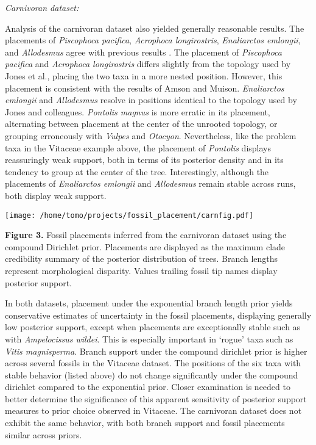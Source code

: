 \documentclass[12pt]{article}
\begin{document}
\noindent\emph{Carnivoran dataset:}

Analysis of the carnivoran dataset also yielded generally reasonable
results. The placements of \emph{Piscophoca pacifica}, \emph{Acrophoca
longirostris}, \emph{Enaliarctos emlongii}, and \emph{Allodesmus} agree
with previous results \citep{amson2014,jones2015impact}. The
placement of \emph{Piscophoca pacifica} and \emph{Acrophoca
longirostris} differs slightly from the topology used by Jones et al.,
placing the two taxa in a more nested position. However, this placement
is consistent with the results of Amson and Muison. \emph{Enaliarctos
emlongii} and \emph{Allodesmus} resolve in positions identical to the
topology used by Jones and colleagues. \emph{Pontolis magnus} is more
erratic in its placement, alternating between placement at the center of
the unrooted topology, or grouping erroneously with \emph{Vulpes} and
\emph{Otocyon}. Nevertheless, like the problem taxa in the Vitaceae
example above, the placement of \emph{Pontolis} displays reassuringly
weak support, both in terms of its posterior density and in its tendency
to group at the center of the tree. Interestingly, although the
placements of \emph{Enaliarctos emlongii} and \emph{Allodesmus} remain
stable across runs, both display weak support.

\texttt{[image: /home/tomo/projects/fossil\_placement/carnfig.pdf]}

\textbf{Figure 3.} Fossil placements inferred from the carnivoran
dataset using the compound Dirichlet prior. Placements are displayed as
the maximum clade credibility summary of the posterior distribution of
trees. Branch lengths represent morphological disparity. Values trailing
fossil tip names display posterior support.

In both datasets, placement under the exponential branch length prior
yields conservative estimates of uncertainty in the fossil placements,
displaying generally low posterior support, except when placements are
exceptionally stable such as with \emph{Ampelocissus wildei}. This is
especially important in `rogue' taxa such as \emph{Vitis magnisperma}.
Branch support under the compound dirichlet prior is higher across several fossils in the Vitaceae dataset. The
positions of the six taxa with stable behavior (listed above) do not
change significantly under the compound dirichlet compared to the
exponential prior. Closer examination is needed to better determine the
significance of this apparent sensitivity of posterior support measures to prior choice observed in
Vitaceae. The carnivoran dataset does not exhibit the same behavior,
with both branch support and fossil placements similar across priors.
\end{document}
